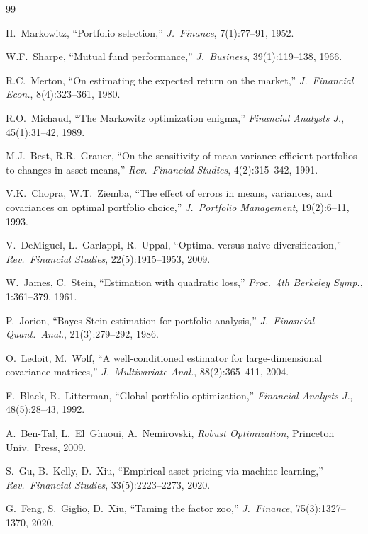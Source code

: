 \documentclass[10pt,twocolumn]{article}
\begin{document}
\newpage
{\small
\begin{thebibliography}{99}

H.~Markowitz, ``Portfolio selection,''
\textit{J.~Finance}, 7(1):77--91, 1952.

W.F.~Sharpe, ``Mutual fund performance,''
\textit{J.~Business}, 39(1):119--138, 1966.

R.C.~Merton, ``On estimating the expected return on the market,''
\textit{J.~Financial Econ.}, 8(4):323--361, 1980.

R.O.~Michaud, ``The Markowitz optimization enigma,''
\textit{Financial Analysts J.}, 45(1):31--42, 1989.

M.J.~Best, R.R.~Grauer, ``On the sensitivity of mean-variance-efficient
portfolios to changes in asset means,''
\textit{Rev.~Financial Studies}, 4(2):315--342, 1991.

V.K.~Chopra, W.T.~Ziemba, ``The effect of errors in means, variances,
and covariances on optimal portfolio choice,''
\textit{J.~Portfolio Management}, 19(2):6--11, 1993.

V.~DeMiguel, L.~Garlappi, R.~Uppal, ``Optimal versus naive
diversification,''
\textit{Rev.~Financial Studies}, 22(5):1915--1953, 2009.

W.~James, C.~Stein, ``Estimation with quadratic loss,''
\textit{Proc.~4th Berkeley Symp.}, 1:361--379, 1961.

P.~Jorion, ``Bayes-Stein estimation for portfolio analysis,''
\textit{J.~Financial Quant.~Anal.}, 21(3):279--292, 1986.

O.~Ledoit, M.~Wolf, ``A well-conditioned estimator for
large-dimensional covariance matrices,''
\textit{J.~Multivariate Anal.}, 88(2):365--411, 2004.

F.~Black, R.~Litterman, ``Global portfolio optimization,''
\textit{Financial Analysts J.}, 48(5):28--43, 1992.

A.~Ben-Tal, L.~El~Ghaoui, A.~Nemirovski,
\textit{Robust Optimization}, Princeton Univ.~Press, 2009.

S.~Gu, B.~Kelly, D.~Xiu, ``Empirical asset pricing via machine
learning,''
\textit{Rev.~Financial Studies}, 33(5):2223--2273, 2020.

G.~Feng, S.~Giglio, D.~Xiu, ``Taming the factor zoo,''
\textit{J.~Finance}, 75(3):1327--1370, 2020.


\end{thebibliography}}
\end{document}
